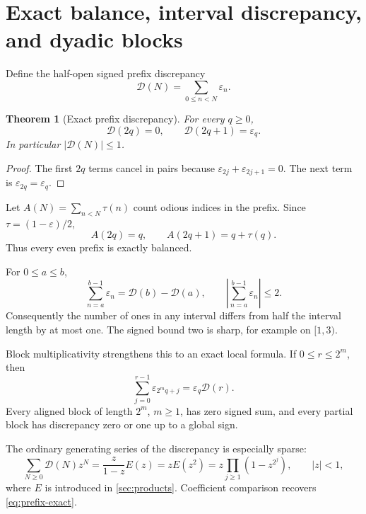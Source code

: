\documentclass[11pt,oneside]{article}
\numberwithin{equation}{section}
\newtheorem{theorem}{Theorem}[section]
\theoremstyle{definition}
\theoremstyle{remark}
\newcommand{\eps}{\varepsilon}
\newcommand{\TM}{\tau}
\begin{document}
\section{Exact balance, interval discrepancy, and dyadic blocks}
\label{sec:balance}

Define the half-open signed prefix discrepancy
\begin{equation}
 \mathcal D(N)=\sum_{0\le n<N}\eps_n.
 \label{eq:prefix-D}
\end{equation}

\begin{theorem}[Exact prefix discrepancy]
For every \(q\ge0\),
\begin{equation}
 \boxed{\mathcal D(2q)=0,\qquad
 \mathcal D(2q+1)=\eps_q.}
 \label{eq:prefix-exact}
\end{equation}
In particular \(|\mathcal D(N)|\le1\).
\end{theorem}

\begin{proof}
The first \(2q\) terms cancel in pairs because
\(\eps_{2j}+\eps_{2j+1}=0\).  The next term is
\(\eps_{2q}=\eps_q\).
\end{proof}

Let \(A(N)=\sum_{n<N}\TM(n)\) count odious indices in the prefix.  Since
\(\TM=(1-\eps)/2\),
\begin{equation}
 \boxed{A(2q)=q,\qquad A(2q+1)=q+\TM(q).}
 \label{eq:prefix-one-count}
\end{equation}
Thus every even prefix is exactly balanced.

For \(0\le a\le b\),
\begin{equation}
 \sum_{n=a}^{b-1}\eps_n=\mathcal D(b)-\mathcal D(a),
 \qquad
 \left|\sum_{n=a}^{b-1}\eps_n\right|\le2.
 \label{eq:interval-discrepancy}
\end{equation}
Consequently the number of ones in any interval differs from half the interval
length by at most one.  The signed bound two is sharp, for example on
\([1,3)\).

Block multiplicativity strengthens this to an exact local formula.  If
\(0\le r\le2^m\), then
\begin{equation}
 \boxed{\sum_{j=0}^{r-1}\eps_{2^mq+j}=\eps_q\mathcal D(r).}
 \label{eq:partial-block}
\end{equation}
Every aligned block of length \(2^m\), \(m\ge1\), has zero signed sum, and
every partial block has discrepancy zero or one up to a global sign.

The ordinary generating series of the discrepancy is especially sparse:
\begin{equation}
 \sum_{N\ge0}\mathcal D(N)z^N
 =\frac{z}{1-z}E(z)=zE(z^2)
 =z\prod_{j\ge1}(1-z^{2^j}),
 \qquad |z|<1,
 \label{eq:prefix-generating-D}
\end{equation}
where \(E\) is introduced in \cref{sec:products}.  Coefficient comparison
recovers \eqref{eq:prefix-exact}.
\end{document}
